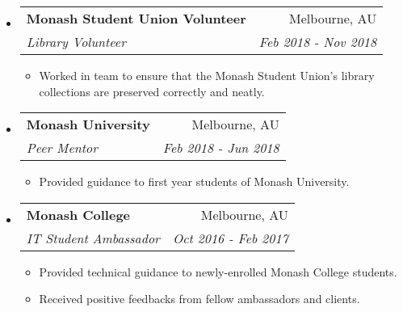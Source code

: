 \documentclass[letterpaper,11pt]{article}
\makeatletter
\newcommand{\resitem}[1]{\item #1 \vspace{-2pt}}
\newcommand{\ressubheading}[4]{
\begin{tabular*}{6.5in}{l@{\cftdotfill{\cftsecdotsep}\extracolsep{\fill}}r}
		\textbf{#1} & #2 \\
		\textit{#3} & \textit{#4} \\
\end{tabular*}
\vspace{-2pt}
}
\makeatother
\begin{document}
\begin{itemize}

\item
	\ressubheading{Monash Student Union Volunteer}{Melbourne, AU}{Library Volunteer}{Feb 2018 - Nov 2018}
	\begin{itemize}
			\resitem{Worked in team to ensure that the Monash Student Union’s library collections are preserved correctly and neatly.}
\end{itemize}

\item
	\ressubheading{Monash University}{Melbourne, AU}{Peer Mentor}{Feb 2018 - Jun 2018}
	\begin{itemize}
			\resitem{Provided guidance to first year students of Monash University.}
\end{itemize}

\item
	\ressubheading{Monash College}{Melbourne, AU}{IT Student Ambassador}{Oct 2016 - Feb 2017}
	\begin{itemize}
			\resitem{Provided technical guidance to newly-enrolled Monash College students.}
			\resitem{Received positive feedbacks from fellow ambassadors and clients.}
\end{itemize}

\end{itemize}
\end{document}
